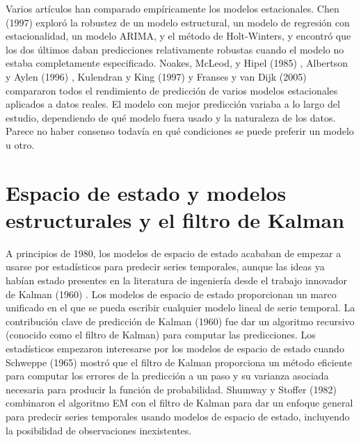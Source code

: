 \documentclass{llncs}
\begin{document}
Varios artículos han comparado empíricamente los modelos estacionales. Chen (1997) \cite{Chen1997269} exploró la robustez de un modelo estructural, un modelo de regresión con estacionalidad, un modelo ARIMA, y el método de Holt-Winters, y encontró que los dos últimos daban predicciones relativamente robustas cuando el modelo no estaba completamente especificado. Noakes, McLeod, y Hipel (1985) \cite{Noakes1985179}, Albertson y Aylen (1996) \cite{Albertson1996345}, Kulendran y King (1997) \cite{Kulendran1997319} y Franses y van Dijk (2005) \cite{Franses200587} compararon todos el rendimiento de predicción de varios modelos estacionales aplicados a datos reales. El modelo con mejor predicción variaba a lo largo del estudio, dependiendo de qué modelo fuera usado y la naturaleza de los datos. Parece no haber consenso todavía en qué condiciones se puede preferir un modelo u otro.

\section{Espacio de estado y modelos estructurales y el filtro de Kalman}

A principios de  1980, los modelos de espacio de estado acababan de empezar a usarse por estadísticos para predecir series temporales, aunque las ideas ya habían estado presentes en la literatura de ingeniería desde el trabajo innovador de Kalman (1960) \cite{Kalman196035}. Los modelos de espacio de estado proporcionan un marco unificado en el que se pueda escribir cualquier modelo lineal de serie temporal. La contribución clave de predicción de Kalman (1960) fue dar un  algoritmo recursivo (conocido como el filtro de Kalman) para computar las predicciones. Los estadísticos empezaron interesarse por los modelos de espacio de estado cuando Schweppe (1965) \cite{Schweppe196561} mostró que el filtro de Kalman proporciona un método eficiente para computar los errores de la predicción a un paso y su varianza asociada necesaria para producir la función de probabilidad. Shumway y Stoffer (1982)\cite{Shumway1982253} combinaron el algoritmo EM con el filtro de Kalman para dar un enfoque general para predecir series temporales usando modelos de espacio de estado, incluyendo la posibilidad de observaciones inexistentes.
\end{document}
